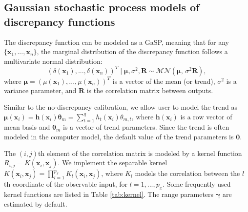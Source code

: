 \subsection{Gaussian stochastic process models of discrepancy functions}

 The discrepancy function can be  modeled as a GaSP, meaning that for any $\{\mathbf x_1,...,\mathbf x_n\}$, the marginal distribution of the discrepancy function follows a multivariate normal distribution: 
\[(\delta(\mathbf x_1),..., \delta(\mathbf x_n))^T \mid  \bm \mu, \sigma^2, \mathbf R \sim  \mathcal{MN}(\bm \mu,\,  \sigma^2 \mathbf R), \]
where $\bm \mu=(\mu(\mathbf x_1),...,\mu(\mathbf x_n))^T $ is a vector of the mean (or trend),  $\sigma^2$ is a variance parameter, and $\mathbf R$ is the correlation matrix between outputs. 

Similar to the no-discrepancy calibration, we allow user to model the trend as $\bm \mu(\mathbf x_i)=  \mathbf h(\mathbf x_i) \bm \theta_{m}=\sum^q_{t=1}h_t(\mathbf x_i)  \theta_{m,t} $, where  $\mathbf h(\mathbf x_i)$ is a row vector of mean basis and $\bm \theta_{m}$ is a vector of trend parameters. Since the trend is often modeled in the computer model, the default value of the trend  parameters is $\mathbf 0$. 

The $(i,j)$th element of the correlation matrix is modeled by a kernel function $R_{i,j}=K(\mathbf x_i, \mathbf x_j)$. We implement the separable kernel  $K(\mathbf x_i, \mathbf x_j)=\prod^{p_x}_{l=1}K_l(\mathbf x_i, \mathbf x_j)$, where $K_l$ models the correlation between the $l$th coordinate of the observable input, for $l=1,...,p_x$. Some frequently used kernel functions are listed in Table \ref{tab:kernel}. The range parameters $\bm \gamma$ are estimated by default. 


